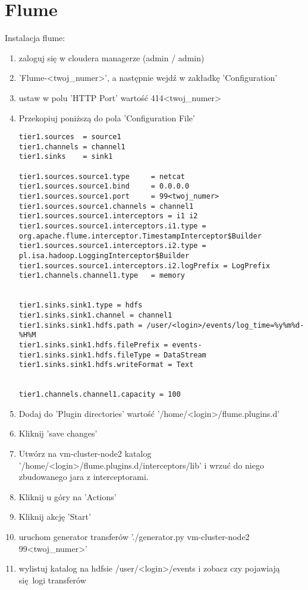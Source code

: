 \documentclass{article}
\begin{document}
\section*{Flume}

Instalacja flume:
\begin{enumerate}
\item zaloguj się w cloudera managerze (admin / admin)
\item 'Flume-<twoj\_numer>', a następnie wejdź w zakładkę 'Configuration'
\item ustaw w polu 'HTTP Port' wartość 414<twoj\_numer>
\item Przekopiuj poniższą do pola 'Configuration File'
\begin{lstlisting}
tier1.sources  = source1
tier1.channels = channel1
tier1.sinks    = sink1

tier1.sources.source1.type     = netcat
tier1.sources.source1.bind     = 0.0.0.0
tier1.sources.source1.port     = 99<twoj_numer>
tier1.sources.source1.channels = channel1
tier1.sources.source1.interceptors = i1 i2
tier1.sources.source1.interceptors.i1.type = org.apache.flume.interceptor.TimestampInterceptor$Builder
tier1.sources.source1.interceptors.i2.type = pl.isa.hadoop.LoggingInterceptor$Builder
tier1.sources.source1.interceptors.i2.logPrefix = LogPrefix
tier1.channels.channel1.type   = memory


tier1.sinks.sink1.type = hdfs
tier1.sinks.sink1.channel = channel1
tier1.sinks.sink1.hdfs.path = /user/<login>/events/log_time=%y%m%d-%H%M
tier1.sinks.sink1.hdfs.filePrefix = events-
tier1.sinks.sink1.hdfs.fileType = DataStream
tier1.sinks.sink1.hdfs.writeFormat = Text


tier1.channels.channel1.capacity = 100
\end{lstlisting}
\item Dodaj do 'Plugin directories' wartość '/home/<login>/flume.plugins.d'
\item Kliknij 'save changes'
\item Utwórz na vm-cluster-node2 katalog '/home/<login>/flume.plugins.d/interceptors/lib' i wrzuć do niego zbudowanego jara z interceptorami.
\item Kliknij u góry na 'Actions'
\item Kliknij akcję 'Start'
\item uruchom generator transferów './generator.py vm-cluster-node2 99<twoj\_numer>'
\item wylistuj katalog na hdfsie /user/<login>/events i zobacz czy pojawiają się logi transferów
\end{enumerate}
\end{document}
